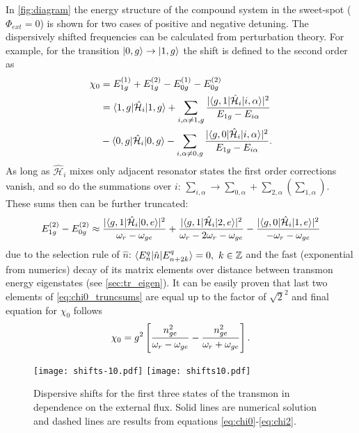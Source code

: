 In \autoref{fig:diagram} the energy structure of the compound system in the sweet-spot ($\Phi_{ext}=0$) is shown for two cases of positive and negative detuning. The dispersively shifted frequencies can be calculated from perturbation theory. For example, for the transition $\lvert0, g\rangle\rightarrow \lvert1, g\rangle$ the shift is defined to the second order as
\begin{align*}
\chi_0 &=  E_{1g}^{(1)} + E_{1g}^{(2)} - E_{0g}^{(1)} - E_{0g}^{(2)}\\
 &= \langle1, g\rvert\mathcal{\hat H}_i\lvert1,g\rangle + \sum_{i, \alpha \neq 1, g} \frac{|\langle g, 1\rvert\mathcal{\hat H}_i\lvert i,\alpha\rangle |^2}{E_{1g} - E_{i\alpha}}\\
 & - \langle0, g\rvert\mathcal{\hat H}_i\lvert0,g\rangle - \sum_{i, \alpha \neq 0, g} \frac{|\langle g, 0\rvert\mathcal{\hat H}_i\lvert i,\alpha\rangle |^2}{E_{1g} - E_{i\alpha}}.
\end{align*}
As long as $\mathcal{\hat H}_i$ mixes only adjacent resonator states the first order corrections vanish, and so do the summations over $i$: $\sum_{i, \alpha} \rightarrow \sum_{0,\alpha} + \sum_{2,\alpha} (\sum_{1,\alpha})$. These sums then can be further truncated:
\begin{equation}
E_{1g}^{(2)} - E_{0g}^{(2)} \approx \frac{|\langle g,1\rvert\mathcal{\hat H}_i\lvert0,e\rangle|^2}{\omega_r - \omega_{ge}} + \frac{|\langle g,1\rvert\mathcal{\hat H}_i\lvert2,e\rangle|^2}{\omega_r - 2\omega_r - \omega_{ge}} -
\frac{|\langle g,0\rvert\mathcal{\hat H}_i\lvert1,e\rangle|^2}{-\omega_r - \omega_{ge}}\label{eq:chi0_truncsums}
\end{equation} 
due to the selection rule of $\hat n$: $\langle E^q_n\rvert\hat n \lvert E^q_{n+2k}\rangle = 0,\ k \in \mathbb{Z}$ and the fast (exponential from numerics) decay of its matrix elements over distance between transmon energy eigenstates (see \autoref{sec:tr_eigen}). It can be easily proven that last two elements of \eqref{eq:chi0_truncsums} are equal up to the factor of $\sqrt{2}^2$ and final equation for $\chi_0$ follows
\begin{equation}
\chi_0 = g^2\left[ \frac{n_{ge}^2}{\omega_r - \omega_{ge}}-\frac{n_{ge}^2}{\omega_r + \omega_{ge}} \right].
\label{eq:chi0}
\end{equation}

\begin{figure}[h!]
\centering
\texttt{[image: shifts-10.pdf]}
\texttt{[image: shifts10.pdf]}
\caption{Dispersive shifts for the first three states of the transmon in dependence on the external flux. Solid lines are numerical solution and dashed lines are results from equations \eqref{eq:chi0}-\eqref{eq:chi2}.}
\label{fig:disp_shifts}
\end{figure}

